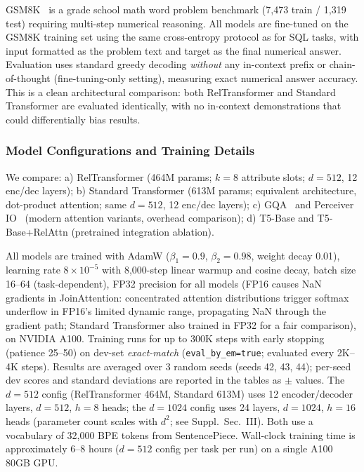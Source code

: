\documentclass[conference]{IEEEtran}
\begin{document}
{GSM8K}~\cite{yuan2023scaling} is a grade school math word problem benchmark (7,473 train / 1,319 test) requiring multi-step numerical reasoning. All models are fine-tuned on the GSM8K training set using the same cross-entropy protocol as for SQL tasks, with input formatted as the problem text and target as the final numerical answer. Evaluation uses standard greedy decoding \emph{without} any in-context prefix or chain-of-thought (fine-tuning-only setting), measuring exact numerical answer accuracy. This is a clean architectural comparison: both RelTransformer and Standard Transformer are evaluated identically, with no in-context demonstrations that could differentially bias results.

\subsubsection{Model Configurations and Training Details}

We compare: a) {RelTransformer} (464M params; $k{=}8$ attribute slots; $d{=}512$, 12 enc/dec layers); b) {Standard Transformer} (613M params; equivalent architecture, dot-product attention; same $d{=}512$, 12 enc/dec layers); c) {GQA}~\cite{ainslie2023gqa} and {Perceiver IO}~\cite{jaegle2022perceiver} (modern attention variants, overhead comparison); d) {T5-Base} and {T5-Base+RelAttn} (pretrained integration ablation).

All models are trained with AdamW ($\beta_1{=}0.9$, $\beta_2{=}0.98$, weight decay 0.01), learning rate $8{\times}10^{-5}$ with 8,000-step linear warmup and cosine decay, batch size 16--64 (task-dependent), {FP32 precision for all models} (FP16 causes NaN gradients in JoinAttention: concentrated attention distributions trigger softmax underflow in FP16's limited dynamic range, propagating NaN through the gradient path; Standard Transformer also trained in FP32 for a fair comparison), on NVIDIA A100. Training runs for up to 300K steps with early stopping (patience 25--50) on dev-set \emph{exact-match} (\texttt{eval\_by\_em=true}; evaluated every 2K--4K steps). Results are averaged over 3 random seeds (seeds 42, 43, 44); per-seed dev scores and standard deviations are reported in the tables as $\pm$ values. The $d{=}512$ config (RelTransformer 464M, Standard 613M) uses 12 encoder/decoder layers, $d{=}512$, $h{=}8$ heads; the $d{=}1024$ config uses 24 layers, $d{=}1024$, $h{=}16$ heads (parameter count scales with $d^2$; see Suppl.\ Sec.~III). Both use a vocabulary of 32,000 BPE tokens from SentencePiece. Wall-clock training time is approximately 6--8 hours ($d{=}512$ config per task per run) on a single A100 80GB GPU.
\end{document}
